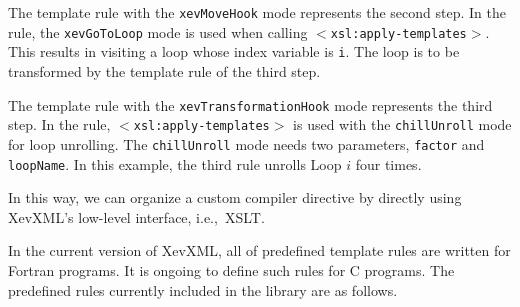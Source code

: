 The template rule with the \texttt{xevMoveHook} mode represents the
second step. In the rule, the \texttt{xevGoToLoop} mode is used when
calling \texttt{$<$xsl:apply-templates$>$}. This results in visiting a
loop whose index variable is \texttt{i}. The loop is to be transformed
by the template rule of the third step.

The template rule with the \texttt{xevTransformationHook} mode
represents the third step. In the rule,
\texttt{$<$xsl:apply-templates$>$} is used with the
\texttt{chillUnroll} mode for loop unrolling. The
\texttt{chillUnroll} mode needs two parameters, \texttt{factor} and
\texttt{loopName}. In this example, the third rule unrolls Loop $i$ four
times.

In this way, we can organize a custom compiler directive by directly
using XevXML's low-level interface, i.e.,~XSLT.

In the current version of XevXML, all of predefined template rules are
written for Fortran programs. It is ongoing to define such rules for C
programs.  The predefined rules currently included in the library are as
follows.

\vspace{36pt}

